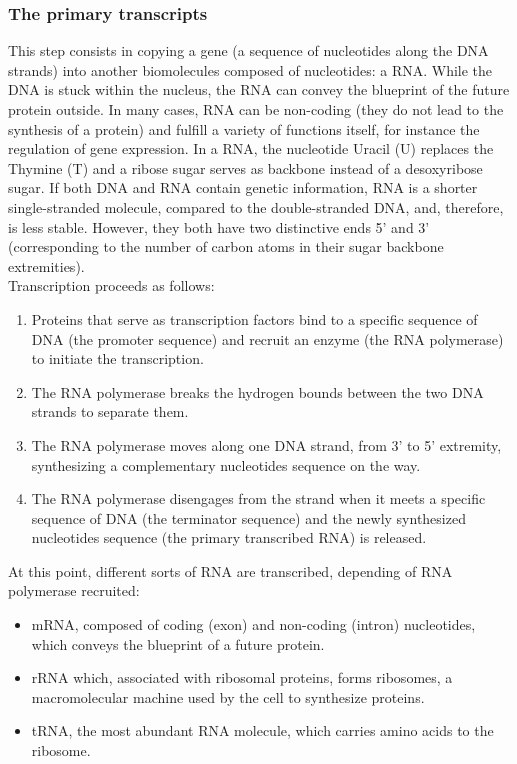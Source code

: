 \subsubsection{The primary transcripts}

This step consists in copying a gene (a sequence of nucleotides along the \ac{DNA} strands) into another biomolecules composed of nucleotides: a \ac{RNA}.
While the \ac{DNA} is stuck within the nucleus, the \ac{RNA} can convey the blueprint of the future protein outside.
In many cases, \ac{RNA} can be non-coding (they do not lead to the synthesis of a protein) and fulfill a variety of functions itself, for instance the regulation of gene expression.
In a \ac{RNA}, the nucleotide Uracil (U) replaces the Thymine (T) and a ribose sugar serves as backbone instead of a desoxyribose sugar.
If both \ac{DNA} and \ac{RNA} contain genetic information, \ac{RNA} is a shorter single-stranded molecule, compared to the double-stranded \ac{DNA}, and, therefore, is less stable.
However, they both have two distinctive ends 5' and 3' (corresponding to the number of carbon atoms in their sugar backbone extremities).\\

\noindent
Transcription proceeds as follows:
\begin{enumerate}
	\setlength\itemsep{0.1em}
	\item Proteins that serve as transcription factors bind to a specific sequence of \ac{DNA} (the promoter sequence) and recruit an enzyme (the \ac{RNA} polymerase) to initiate the transcription.
	\item The \ac{RNA} polymerase breaks the hydrogen bounds between the two \ac{DNA} strands to separate them.
	\item The \ac{RNA} polymerase moves along one \ac{DNA} strand, from 3' to 5' extremity, synthesizing a complementary nucleotides sequence on the way.
	\item The \ac{RNA} polymerase disengages from the strand when it meets a specific sequence of \ac{DNA} (the terminator sequence) and the newly synthesized nucleotides sequence (the primary transcribed \ac{RNA}) is released.
\end{enumerate}

\noindent
At this point, different sorts of \ac{RNA} are transcribed, depending of \ac{RNA} polymerase recruited:
\begin{itemize}
	\setlength\itemsep{0.1em}
	\item \ac{mRNA}, composed of coding (exon) and non-coding (intron) nucleotides, which conveys the blueprint of a future protein.
	\item \ac{rRNA} which, associated with ribosomal proteins, forms ribosomes, a macromolecular machine used by the cell to synthesize proteins.
	\item \ac{tRNA}, the most abundant \ac{RNA} molecule, which carries amino acids to the ribosome.
\end{itemize}

